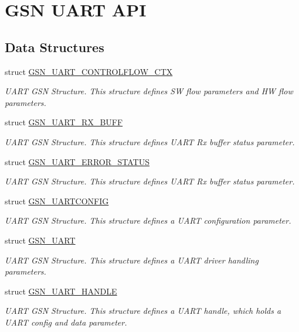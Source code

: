 \hypertarget{a00656}{
\section{GSN UART API}
\label{a00656}
}
\subsection*{Data Structures}
\begin{DoxyCompactItemize}
\item 
struct \hyperlink{a00264}{GSN\_\-UART\_\-CONTROLFLOW\_\-CTX}
\begin{DoxyCompactList}\small\item\em UART GSN Structure. This structure defines SW flow parameters and HW flow parameters. \end{DoxyCompactList}\item 
struct \hyperlink{a00267}{GSN\_\-UART\_\-RX\_\-BUFF}
\begin{DoxyCompactList}\small\item\em UART GSN Structure. This structure defines UART Rx buffer status parameter. \end{DoxyCompactList}\item 
struct \hyperlink{a00265}{GSN\_\-UART\_\-ERROR\_\-STATUS}
\begin{DoxyCompactList}\small\item\em UART GSN Structure. This structure defines UART Rx buffer status parameter. \end{DoxyCompactList}\item 
struct \hyperlink{a00268}{GSN\_\-UARTCONFIG}
\begin{DoxyCompactList}\small\item\em UART GSN Structure. This structure defines a UART configuration parameter. \end{DoxyCompactList}\item 
struct \hyperlink{a00263}{GSN\_\-UART}
\begin{DoxyCompactList}\small\item\em UART GSN Structure. This structure defines a UART driver handling parameters. \end{DoxyCompactList}\item 
struct \hyperlink{a00266}{GSN\_\-UART\_\-HANDLE}
\begin{DoxyCompactList}\small\item\em UART GSN Structure. This structure defines a UART handle, which holds a UART config and data parameter. \end{DoxyCompactList}\end{DoxyCompactItemize}
